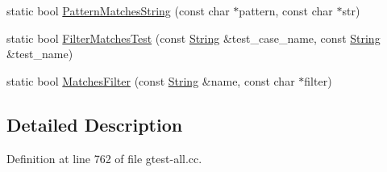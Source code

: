 \begin{DoxyCompactItemize}
static bool \hyperlink{classtesting_1_1internal_1_1UnitTestOptions_a6b82fa8a22631235f28e0118a5081212}{\-Pattern\-Matches\-String} (const char $\ast$pattern, const char $\ast$str)
\item 
static bool \hyperlink{classtesting_1_1internal_1_1UnitTestOptions_a85eb1600f60958c236de05eee63b0213}{\-Filter\-Matches\-Test} (const \hyperlink{classtesting_1_1internal_1_1String}{\-String} \&test\-\_\-case\-\_\-name, const \hyperlink{classtesting_1_1internal_1_1String}{\-String} \&test\-\_\-name)
\item 
static bool \hyperlink{classtesting_1_1internal_1_1UnitTestOptions_ad1c3339c3fd45cb6900c3829932a3859}{\-Matches\-Filter} (const \hyperlink{classtesting_1_1internal_1_1String}{\-String} \&name, const char $\ast$filter)
\end{DoxyCompactItemize}


\subsection{\-Detailed \-Description}


\-Definition at line 762 of file gtest-\/all.\-cc.



